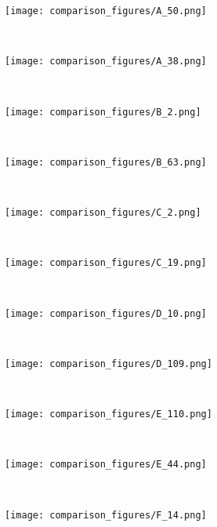 \documentclass[conference]{IEEEtran}
\begin{document}
\begin{figure*}[!htbp]
\centering
    \begin{subfigure}[b]{0.15\textwidth}
        \texttt{[image: comparison\_figures/A\_50.png]}
    \end{subfigure}
    ~ %
    \begin{subfigure}[b]{0.15\textwidth}
        \texttt{[image: comparison\_figures/A\_38.png]}
    \end{subfigure}
    ~
    \begin{subfigure}[b]{0.15\textwidth}
        \texttt{[image: comparison\_figures/B\_2.png]}
    \end{subfigure}
    ~
    \begin{subfigure}[b]{0.15\textwidth}
        \texttt{[image: comparison\_figures/B\_63.png]}
    \end{subfigure}
    ~
    \begin{subfigure}[b]{0.15\textwidth}
        \texttt{[image: comparison\_figures/C\_2.png]}
    \end{subfigure}
    ~
    \begin{subfigure}[b]{0.15\textwidth}
        \texttt{[image: comparison\_figures/C\_19.png]}
    \end{subfigure}
    ~
    \begin{subfigure}[b]{0.15\textwidth}
        \texttt{[image: comparison\_figures/D\_10.png]}
    \end{subfigure}
    ~
    \begin{subfigure}[b]{0.15\textwidth}
        \texttt{[image: comparison\_figures/D\_109.png]}
    \end{subfigure}
    ~
    \begin{subfigure}[b]{0.15\textwidth}
        \texttt{[image: comparison\_figures/E\_110.png]}
    \end{subfigure}
    ~
    \begin{subfigure}[b]{0.15\textwidth}
        \texttt{[image: comparison\_figures/E\_44.png]}
    \end{subfigure}
    ~
    \begin{subfigure}[b]{0.15\textwidth}
        \texttt{[image: comparison\_figures/F\_14.png]}
    \end{subfigure}

\end{figure*}
\end{document}
